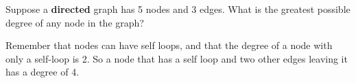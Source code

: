 \begin{prob}

    Suppose a \textbf{directed} graph has 5 nodes and 3 edges. What is the
    greatest possible degree of any node in the graph?


    \begin{soln}
        Remember that nodes can have self loops, and that the degree of a node
        with only a self-loop is 2. So a node that has a self loop and two
        other edges leaving it has a degree of 4.
    \end{soln}


\end{prob}
